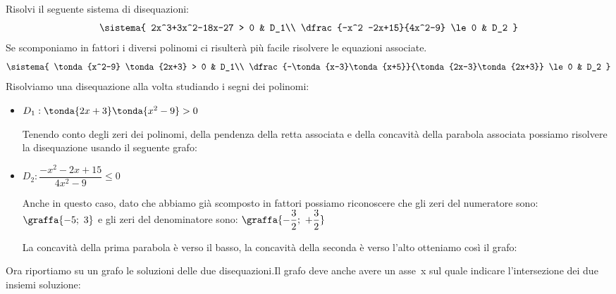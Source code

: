 \newpage %

\begin{esempio}
 
Risolvi il seguente sistema di disequazioni:
\[\sistema{
    2x^3+3x^2-18x-27 > 0 & D_1\\
    \dfrac{-x^2 -2x+15}{4x^2-9} \le 0 & D_2
  }
\]
Se scomponiamo in fattori i diversi polinomi ci risulterà più facile 
risolvere le equazioni associate.
\[\sistema{
    \tonda{x^2-9} \tonda{2x+3} > 0 & D_1\\
    \dfrac{-\tonda{x-3}\tonda{x+5}}{\tonda{2x-3}\tonda{2x+3}} \le 0 & D_2
  }
\]
Risolviamo una disequazione alla volta studiando i segni dei polinomi:

\begin{itemize}
 \item \(D_1: \tonda{2x+3} \tonda{x^2-9}>0\)

\begin{minipage}{.49\textwidth}
Tenendo conto degli zeri dei polinomi, della pendenza della retta associata 
e della concavità della parabola associata possiamo risolvere la disequazione 
usando il seguente grafo:
\end{minipage}
\hfill
\begin{minipage}{.49\textwidth}
\begin{center} \segnosistemaaa \end{center}
\end{minipage}

 \item \(D_2: \dfrac{-x^2 -2x+15}{4x^2-9} \le 0\)

Anche in questo caso, dato che abbiamo già scomposto in fattori possiamo 
riconoscere che gli zeri del numeratore sono:
\(\graffa{-5;~3}\) 
e gli zeri del denominatore sono:
\(\graffa{-\dfrac{3}{2};~+\dfrac{3}{2}}\) 

La concavità della prima parabola è verso il basso, 
la concavità della seconda è verso l'alto otteniamo così il grafo:

\begin{center} \segnosistemaab \end{center}

\end{itemize}

\begin{minipage}{.49\textwidth}
Ora riportiamo su un grafo le soluzioni delle due disequazioni.Il grafo deve 
anche avere un asse~x sul quale indicare l'intersezione dei due insiemi 
soluzione:
\end{minipage}
\hfill
\begin{minipage}{.49\textwidth}
\begin{center} \sistemaa \end{center}
\end{minipage}


\end{esempio}

